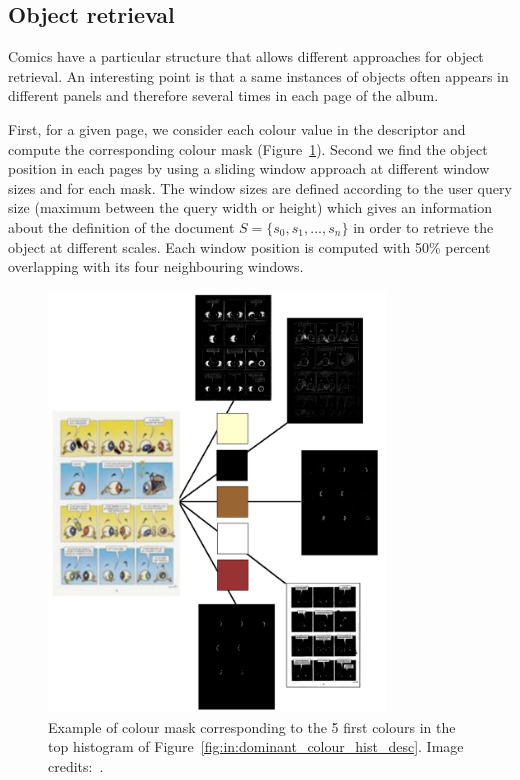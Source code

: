 \subsection{Object retrieval}
Comics have a particular structure that allows different approaches for object retrieval. An interesting point is that a same instances of objects often appears in different panels and therefore several times in each page of the album.

First, for a given page, we consider each colour value in the descriptor and compute the corresponding colour mask (Figure~\ref{fig:in:masks}). %
Second we find the object position in each pages by using a sliding window approach at different window sizes and for each mask.
The window sizes are defined according to the user query size (maximum between the query width or height) which gives an information about the definition of the document $S=\{s_0,s_1,...,s_n\}$ in order to retrieve the object at different scales.
Each window position is computed with 50\% percent overlapping with its four neighbouring windows.

 \begin{figure}[!ht]  %
   \centering
  \includegraphics[width=0.8\textwidth]{masks.png}
  \caption[Colour mask corresponding to five colour of the query descriptor]{Example of colour mask corresponding to the 5 first colours in the top histogram of Figure~\ref{fig:in:dominant_colour_hist_desc}. Image credits:~\cite{Noeils11}.}
  \label{fig:in:masks}
 \end{figure}


